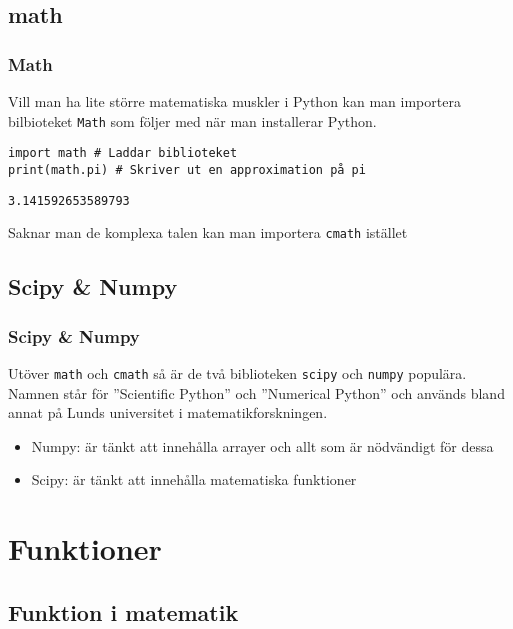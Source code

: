 \documentclass[aspectratio=169]{beamer}
\begin{document}
\subsection{math}

\begin{frame}[fragile]
	\frametitle{Math}
	
	Vill man ha lite större matematiska muskler i Python kan man importera bilbioteket \lstinline{Math} som följer med när man installerar Python.
	
	\begin{lstlisting}
import math	# Laddar biblioteket
print(math.pi) # Skriver ut en approximation på pi
	\end{lstlisting}
	
	\begin{lstlisting}
3.141592653589793
	\end{lstlisting}
	
	Saknar man de komplexa talen kan man importera \lstinline{cmath} istället

\end{frame}

\subsection{Scipy \& Numpy}

\begin{frame}[fragile]
	\frametitle{Scipy \& Numpy}
	
	Utöver \lstinline{math} och \lstinline{cmath} så är de två biblioteken \lstinline{scipy} och \lstinline{numpy} populära. Namnen står för ''Scientific Python'' och ''Numerical Python'' och används bland annat på Lunds universitet i matematikforskningen.

	\begin{itemize}
		\item Numpy: är tänkt att innehålla arrayer och allt som är nödvändigt för dessa
		\item Scipy: är tänkt att innehålla matematiska funktioner
	\end{itemize}

\end{frame}

\section{Funktioner}

\subsection{Funktion i matematik}
\end{document}
